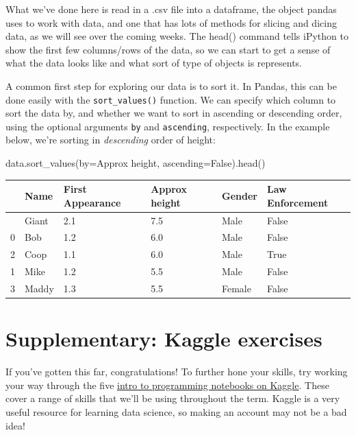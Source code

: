 \documentclass[
  letterpaper,
  DIV=11,
  numbers=noendperiod]{scrreprt}
\newenvironment{Shaded}{\begin{snugshade}}{\end{snugshade}}
\newcommand{\NormalTok}[1]{\textcolor[rgb]{0.00,0.23,0.31}{#1}}
\newcommand{\OperatorTok}[1]{\textcolor[rgb]{0.37,0.37,0.37}{#1}}
\newcommand{\StringTok}[1]{\textcolor[rgb]{0.13,0.47,0.30}{#1}}
\newcommand{\VariableTok}[1]{\textcolor[rgb]{0.07,0.07,0.07}{#1}}
\begin{document}
What we've done here is read in a .csv file into a dataframe, the object
pandas uses to work with data, and one that has lots of methods for
slicing and dicing data, as we will see over the coming weeks. The
head() command tells iPython to show the first few columns/rows of the
data, so we can start to get a sense of what the data looks like and
what sort of type of objects is represents.

A common first step for exploring our data is to sort it. In Pandas,
this can be done easily with the \texttt{sort\_values()} function. We
can specify which column to sort the data by, and whether we want to
sort in ascending or descending order, using the optional arguments
\texttt{by} and \texttt{ascending}, respectively. In the example below,
we're sorting in \emph{descending} order of height:

\begin{Shaded}
\begin{Highlighting}[]
\NormalTok{data.sort\_values(by}\OperatorTok{=}\StringTok{\textquotesingle{}Approx height\textquotesingle{}}\NormalTok{, ascending}\OperatorTok{=}\VariableTok{False}\NormalTok{).head()}
\end{Highlighting}
\end{Shaded}

\begin{longtable}[]{@{}llllll@{}}
\toprule\noalign{}
& Name & First Appearance & Approx height & Gender & Law Enforcement \\
\midrule\noalign{}
\endhead
\bottomrule\noalign{}
\endlastfoot
4 & Giant & 2.1 & 7.5 & Male & False \\
0 & Bob & 1.2 & 6.0 & Male & False \\
2 & Coop & 1.1 & 6.0 & Male & True \\
1 & Mike & 1.2 & 5.5 & Male & False \\
3 & Maddy & 1.3 & 5.5 & Female & False \\
\end{longtable}


\hypertarget{supplementary-kaggle-exercises}{%
\chapter{Supplementary: Kaggle
exercises}\label{supplementary-kaggle-exercises}}

If you've gotten this far, congratulations! To further hone your skills,
try working your way through the five
\href{https://www.kaggle.com/learn/intro-to-programming}{intro to
programming notebooks on Kaggle}. These cover a range of skills that
we'll be using throughout the term. Kaggle is a very useful resource for
learning data science, so making an account may not be a bad idea!
\end{document}
